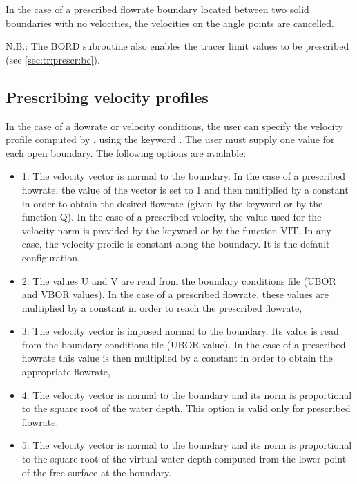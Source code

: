  In the case of a prescribed flowrate boundary located between two solid boundaries with no velocities, the velocities on the angle points are cancelled.

 N.B.: The BORD subroutine also enables the tracer limit values to be prescribed (see \ref{sec:tr:prescr:bc}).


\subsection{ Prescribing velocity profiles}
\label{subs:presc:vel:prof}
 In the case of a flowrate or velocity conditions, the user can specify the velocity profile computed by , using the keyword . The user must supply one value for each open boundary. The following options are available:

\begin{itemize}
\item [\nonumber] 1: The velocity vector is normal to the boundary. In the case of a prescribed flowrate, the value of the vector is set to 1 and then multiplied by a constant in order to obtain the desired flowrate (given by the keyword  or by the function Q). In the case of a prescribed velocity, the value used for the velocity norm is provided by the keyword  or by the function VIT. In any case, the velocity profile is constant along the boundary. It is the default configuration,

\item [\nonumber] 2: The values U and V are read from the boundary conditions file (UBOR and VBOR values). In the case of a prescribed flowrate, these values are multiplied by a constant in order to reach the prescribed flowrate,

\item [\nonumber] 3: The velocity vector is imposed normal to the boundary. Its value is read from the boundary conditions file (UBOR value). In the case of a prescribed flowrate this value is then multiplied by a constant in order to obtain the appropriate flowrate,

\item [\nonumber] 4: The velocity vector is normal to the boundary and its norm is proportional to the square root of the water depth. This option is valid only for prescribed flowrate.

\item [\nonumber] 5: The velocity vector is normal to the boundary and its norm is proportional to the square root of the virtual water depth computed from the lower point of the free surface at the boundary.
\end{itemize}

